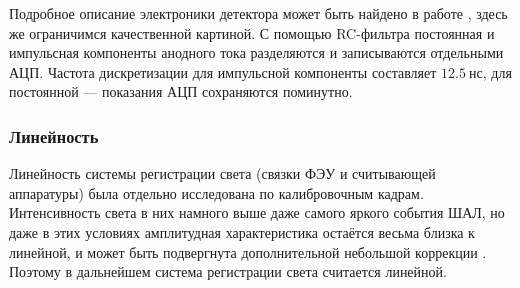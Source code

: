 Подробное описание электроники детектора может быть найдено в работе \cite{SphereDetector2020}, здесь же ограничимся качественной картиной. С помощью RC-фильтра постоянная и импульсная компоненты анодного тока разделяются и записываются отдельными АЦП. Частота дискретизации для импульсной компоненты составляет $12.5~\text{нс}$, для постоянной --- показания АЦП сохраняются поминутно.

\subsubsection{Линейность}

Линейность системы регистрации света (связки ФЭУ и считывающей аппаратуры) была отдельно исследована по калибровочным кадрам. Интенсивность света в них намного выше даже самого яркого события ШАЛ, но даже в этих условиях амплитудная характеристика остаётся весьма близка к линейной, и может быть подвергнута дополнительной небольшой коррекции \cite[рис. 6]{SphereCalibration2016}. Поэтому в дальнейшем система регистрации света считается линейной.
